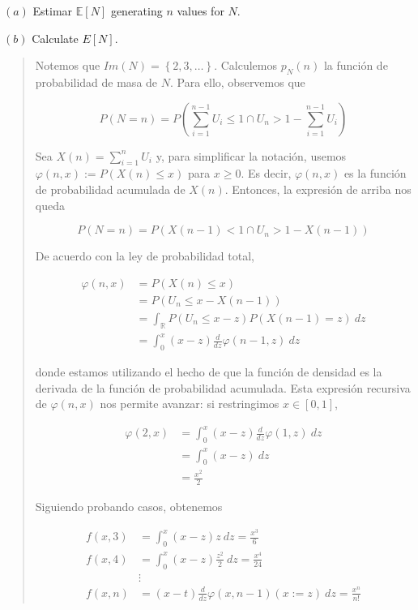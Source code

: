 \documentclass[a4paper, 12pt]{article}
\begin{document}
$(a)$ Estimar $\mathbb{E}[N]$ generating $n$ values for $N$.

$(b)$ Calculate $E[N]$.


\small
\begin{quote}

Notemos que $Im(N) = \left\{ 2, 3, \ldots \right\} $. Calculemos $p_N(n)$ la
función de probabilidad de masa de $N$. Para ello, observemos que 

\begin{equation*}
  P(N = n) = P\left(\sum_{i=1}^{n-1} U_i \leq 1 \cap U_n > 1 - \sum_{i=1}^{n-1}
  U_i\right)
\end{equation*}

Sea $X(n) = \sum_{i=1}^n U_i$ y, para simplificar la notación, usemos
$\varphi(n, x) := P(X(n) \leq x)$ para $x \geq 0$. Es decir, $\varphi(n, x)$ es
la función de probabilidad acumulada de $X(n)$. Entonces, la expresión de arriba
nos queda

\begin{equation*}
  P(N = n) = P(X(n-1) < 1 \cap U_n > 1 -X(n-1)) 
\end{equation*}

De acuerdo con la ley de probabilidad total,


\begin{align*}
  \varphi(n, x) 
  &= P(X(n) \leq x) \\
  &= P(U_n \leq x - X(n-1)) \\
  &= \int_{\mathbb{R}} P(U_n \leq x-z) P\left( X(n-1) = z \right) ~ dz \\ 
  &=\int_0^{x} (x-z) \frac{d}{dz} \varphi(n-1, z) ~ dz
\end{align*}

donde estamos utilizando el hecho de que la función de densidad es la derivada
de la función de probabilidad acumulada. Esta expresión recursiva de $\varphi(n, x)$
nos permite avanzar: si restringimos $x \in [0, 1]$,


\begin{align*}
  \varphi(2, x) 
  &= \int_0^x(x-z)\frac{d}{dz}\varphi(1, z) ~ dz \\
  &=\int_0^x(x-z) ~ dz \\ 
  &= \frac{x^2}{2}
\end{align*}

Siguiendo probando casos, obtenemos

\begin{align*}
  f(x, 3) &= \int_0^x(x-z)z ~ dz = \frac{x^3}{6} \\
  f(x, 4) &= \int_0^x(x-z)\frac{z^2}{2} ~ dz = \frac{x^4}{24} \\
          &\vdots \\ 
  f(x, n) &= (x-t) \frac{d}{dz}\varphi(x, n-1)(x:=z) ~ dz = \frac{x^n}{n!}
\end{align*}


\end{quote}
\end{document}
